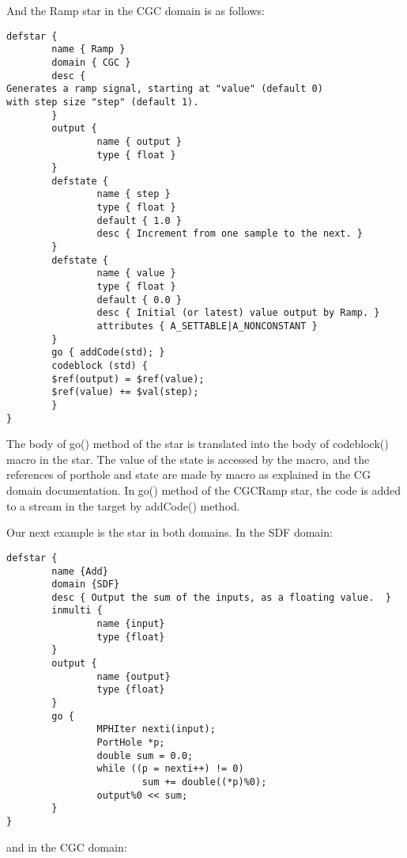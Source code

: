 And the Ramp star in the CGC domain is as follows:

\begin{verbatim}
defstar {
        name { Ramp }
        domain { CGC }
        desc {
Generates a ramp signal, starting at "value" (default 0)
with step size "step" (default 1).
        }
        output {
                name { output }
                type { float }
        }
        defstate {
                name { step }
                type { float }
                default { 1.0 }
                desc { Increment from one sample to the next. }
        }
        defstate {
                name { value }
                type { float }
                default { 0.0 }
                desc { Initial (or latest) value output by Ramp. }
                attributes { A_SETTABLE|A_NONCONSTANT }
        }
        go { addCode(std); }
        codeblock (std) {
        $ref(output) = $ref(value);
        $ref(value) += $val(step);
        }
}
\end{verbatim}

The body of go() method of the 
star is translated into
the body of codeblock() macro in the 
star. The value of
the state  is accessed by the 
macro, and the references of porthole 
and state
are made by
macro as explained in the CG domain documentation. In go() method
of the CGCRamp star, the code is added to a stream in the target
by addCode() method.

Our next example is the 
star in both domains. In the SDF domain:

\begin{verbatim}
defstar {
        name {Add}
        domain {SDF}
        desc { Output the sum of the inputs, as a floating value.  }
        inmulti {
                name {input}
                type {float}
        }
        output {
                name {output}
                type {float}
        }
        go {
                MPHIter nexti(input);
                PortHole *p;
                double sum = 0.0;
                while ((p = nexti++) != 0)
                        sum += double((*p)%0);
                output%0 << sum;
        }
}
\end{verbatim}

and in the CGC domain:

